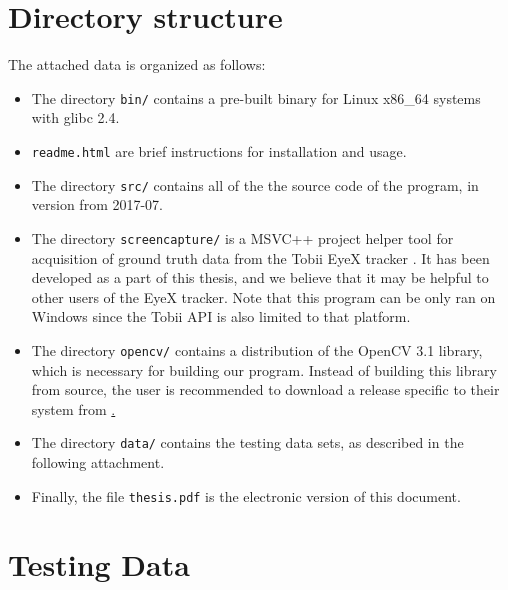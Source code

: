 
\setcounter{section}{0}
\renewcommand{\thesection}{\Alph{section}}

\section{Directory structure}
\label{s:dirstructure}

The attached data is organized as follows:

\begin{itemize}
\item The directory {\tt bin/} contains a pre-built binary for Linux x86\_64 systems with glibc 2.4.

\item {\tt readme.html} are brief instructions for installation and usage.

\item The directory {\tt src/} contains all of the the source code of the program, in version from 2017-07.

\item The directory {\tt screencapture/} is a MSVC++ project helper tool for acquisition of ground truth data from the Tobii EyeX tracker \cite{tobii}.
It has been developed as a part of this thesis, and we believe that it may be helpful to other users of the EyeX tracker.
Note that this program can be only ran on Windows since the Tobii API is also limited to that platform.

\item The directory {\tt opencv/} contains a distribution of the OpenCV 3.1 library, which is necessary for building our program.
Instead of building this library from source, the user is recommended to download a release specific to their system from \href{http://opencv.org}.

\item The directory {\tt data/} contains the testing data sets, as described in the following attachment.

\item Finally, the file {\tt thesis.pdf} is the electronic version of this document.

\end{itemize}

\section{Testing Data}
\label{s:testingdata}

